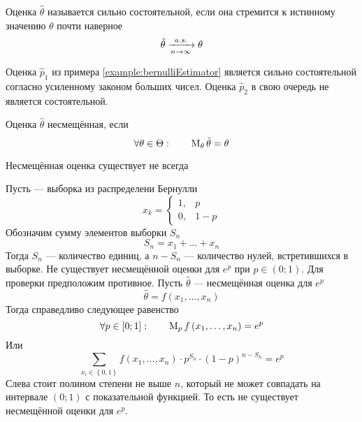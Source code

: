 \begin{definition}
  Оценка $\hat{\theta}$ называется сильно состоятельной,
  если она стремится к истинному значению $\theta$ почти наверное
  $$\hat{\theta}\xrightarrow[n\to\infty]{a.s.}\theta$$
\end{definition}

\begin{example}
  Оценка $\hat{p}_1$ из примера \ref{example:bernulliEstimator}
  является сильно состоятельной согласно усиленному законом больших чисел.
  Оценка $\hat{p}_2$ в свою очередь не является состоятельной.
\end{example}

\begin{definition}
  \label{def:estimatorBias}
  Оценка $\hat{\theta}$ несмещённая, если
  \begin{equation*}
    \forall\theta\in\Theta: \qquad \operatorname{M}_{\theta} \hat{\theta} = \theta
  \end{equation*}
\end{definition}

\begin{remark}
  Несмещённая оценка существует не всегда
\end{remark}

\begin{example}
  Пусть \xsample --- выборка из распределени Бернулли
  \begin{equation*}
    x_k =
    \begin{cases}
      1,& p \\
      0,& 1-p
    \end{cases}
  \end{equation*}
  Обозначим сумму элементов выборки $S_n$
  \begin{equation*}
    S_n = x_1 + \dots + x_n
  \end{equation*}
  Тогда $S_n$ --- количество единиц, а $n-S_n$ --- количество нулей,
  встретившихся в выборке.
  Не существует несмещённой оценки для $e^p$ при $p \in \left( 0; 1 \right)$.
  Для проверки предположим противное.
  Пусть $\hat{\theta}$ --- несмещённая оценка для $e^p$
  \begin{equation*}
    \hat{\theta} = f\left( x_1, \dots, x_n \right)
  \end{equation*}
  Тогда справедливо следующее равенство
  \begin{equation*}
    \forall p \in \left[ 0; 1 \right]:\qquad
    \operatorname{M}_{p} f\left( x_1, \dots, x_n \right)
    = e^p
  \end{equation*}
  Или
  \begin{equation*}
    \sum_{x_i \in \left\{ 0, 1 \right\}} f\left( x_1, \dots, x_n \right)
      \cdot p^{S_n} \cdot \left( 1 - p \right)^{n - S_n}
    = e^p
  \end{equation*}
  Слева стоит полином степени не выше $n$, который не может совпадать на
  интервале $\left( 0; 1 \right)$ с показательной функцией.
  То есть не существует несмещённой оценки для $e^p$.
\end{example}

